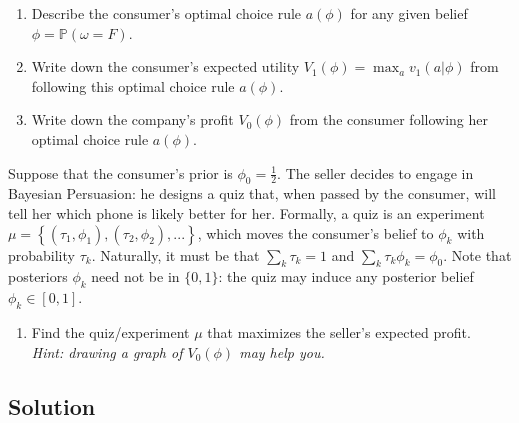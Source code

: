 \documentclass[a4paper]{article}
\newif\ifsolutions
\begin{document}
	\begin{enumerate}
		\item %
		Describe the consumer's optimal choice rule $a(\phi)$ for any given belief $\phi = \mathbb{P}(\omega=F)$.
		\item %
		Write down the consumer's expected utility $V_1(\phi) = \max_a v_1(a|\phi)$ from following this optimal choice rule $a(\phi)$. 
		\item %
		Write down the company's profit $V_0(\phi)$ from the consumer following her optimal choice rule $a(\phi)$.
	\end{enumerate}
	
	Suppose that the consumer's prior is $\phi_0 = \frac{1}{2}$. The seller decides to engage in Bayesian Persuasion: he designs a quiz that, when passed by the consumer, will tell her which phone is likely better for her. Formally, a quiz is an experiment $\mu = \left\{ (\tau_1, \phi_1), (\tau_2, \phi_2), ... \right\}$, which moves the consumer's belief to $\phi_k$ with probability $\tau_k$. Naturally, it must be that $\sum_k \tau_k = 1$ and $\sum_k \tau_k \phi_k = \phi_0$. Note that posteriors $\phi_k$ need not be in $\{0,1\}$: the quiz may induce any posterior belief $\phi_k \in [0,1]$.
	\begin{enumerate}[resume]
		\item %
		Find the quiz/experiment $\mu$ that maximizes the seller's expected profit. \\%
		\emph{Hint: drawing a graph of $V_0(\phi)$ may help you.}
	\end{enumerate}


\ifsolutions
\subsection*{Solution}
\end{document}
